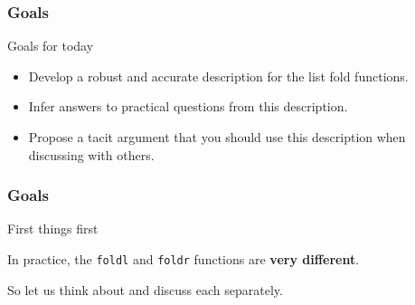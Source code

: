 \begin{frame}
\frametitle{Goals}

\begin{block}{Goals for today}

\begin{itemize}
\item Develop a robust and accurate description for the list fold functions.
\item Infer answers to practical questions from this description.
\item Propose a tacit argument that you should use this description when discussing with others.
\end{itemize}

\end{block}

\end{frame}


\begin{frame}
\frametitle{Goals}

\begin{block}{First things first}

\center
In practice, the \lstinline[basicstyle=\ttfamily]$foldl$ and \lstinline[basicstyle=\ttfamily]$foldr$ functions are \textbf{very different}.

\end{block}

So let us think about and discuss each separately.

\end{frame}
